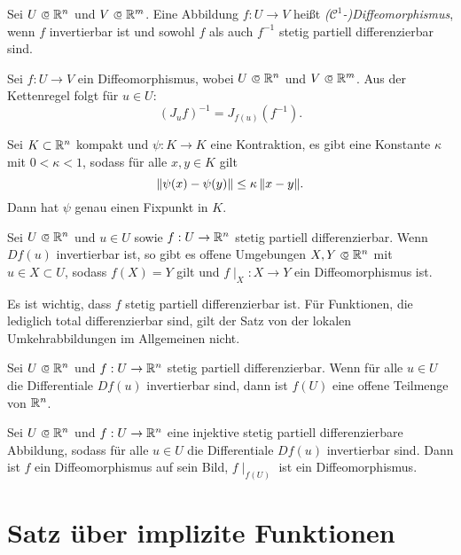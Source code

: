 \documentclass{cheat-sheet}
\begin{document}
\begin{defn}
  Sei $U \opn \R^n$ und $V \opn \R^m$. Eine Abbildung $f : U \to V$ heißt \emph{($\mathcal{C}^1$-)Diffeomorphismus}, wenn $f$ invertierbar ist und sowohl $f$ als auch $f^{-1}$ stetig partiell differenzierbar sind.
\end{defn}

\begin{bem}
  Sei $f : U \to V$ ein Diffeomorphismus, wobei $U \opn \R^n$ und $V \opn \R^m$. Aus der Kettenregel folgt für $u \in U$:
  \[ (J_u f)^{-1} = J_{f(u)}(f^{-1}). \]
\end{bem}

\begin{satz}
  Sei $K \subset \mathbb{R}^n$ kompakt und $\psi : K \to K$ eine Kontraktion, \dh{} es gibt eine Konstante $\kappa$ mit $0 < \kappa < 1$, sodass für alle $x, y \in K$ gilt
  \[ \lVert\psi(x) - \psi(y)\rVert \le \kappa\, \lVert x - y\rVert. \]
  Dann hat $\psi$ genau einen Fixpunkt in $K$.
\end{satz}

\begin{satz}
  Sei $U \opn \R^n$ und $u \in U$ sowie $f : U \to \mathbb{R}^n$ stetig partiell differenzierbar. Wenn $D f(u)$ invertierbar ist, so gibt es offene Umgebungen $X, Y \opn \R^n$ mit $u \in X \subset U$, sodass $f(X) = Y$ gilt und $f\mid_X : X \to Y$ ein Diffeomorphismus ist.
\end{satz}

\begin{bem}
  Es ist wichtig, dass $f$ stetig partiell differenzierbar ist. Für Funktionen, die lediglich total differenzierbar sind, gilt der Satz von der lokalen Umkehrabbildungen im Allgemeinen nicht.
\end{bem}

\begin{kor}[Offenheitssatz]
  Sei $U \opn \R^n$ und $f : U \to \mathbb{R}^n$ stetig partiell differenzierbar. Wenn für alle $u \in U$ die Differentiale $D f(u)$ invertierbar sind, dann ist $f(U)$ eine offene Teilmenge von $\mathbb{R}^n$.
\end{kor}

\begin{samepage}

\begin{kor}
  Sei $U \opn \R^n$ und $f : U \to \mathbb{R}^n$ eine injektive stetig partiell differenzierbare Abbildung, sodass für alle $u \in U$ die Differentiale $D f(u)$ invertierbar sind. Dann ist $f$ ein Diffeomorphismus auf sein Bild, \dh{} $f\mid_{f(U)}$ ist ein Diffeomorphismus.
\end{kor}


\section{Satz über implizite Funktionen}

\end{samepage}
\end{document}
